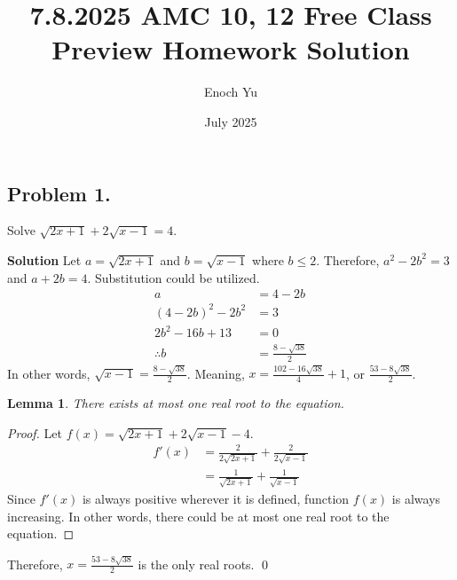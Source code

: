 \documentclass{article}
\title{7.8.2025 AMC 10, 12 Free Class Preview Homework Solution}
\author{Enoch Yu}
\date{July 2025}
\newtheorem*{lemma*}{Lemma}
\newenvironment{solution}{\begin{trivlist}\item[]{\bf Solution}}{\qed \end{trivlist}}
\begin{document}
\maketitle

\subsection*{Problem 1.}
Solve $\sqrt{2x + 1} + 2\sqrt{x - 1} = 4$.

\begin{solution}
Let $a = \sqrt{2x + 1}$ and $b = \sqrt{x - 1}$ where
$b \le 2$. Therefore, $a^2 - 2b^2 = 3$ and $a + 2b = 4$.
Substitution could be utilized.
\begin{align*}
    a &= 4 - 2b \\
    (4 - 2b)^2 - 2b^2 &= 3 \\
    2b^2 - 16b + 13 &= 0 \\
    \therefore b &= \frac{8 - \sqrt{38}}{2}
\end{align*}
In other words, $\sqrt{x - 1} = \frac{8 - \sqrt{38}}{2}$.
Meaning, $x = \frac{102 - 16\sqrt{38}}{4} + 1$,
or $\frac{53 - 8\sqrt{38}}{2}$.
\begin{lemma*}
There exists at most one real root to the equation.
\end{lemma*}
\begin{proof}
Let $f(x) = \sqrt{2x + 1} + 2\sqrt{x - 1} - 4$.
\begin{align*}
    f'(x)
    &= \frac{2}{2\sqrt{2x + 1}} + \frac{2}{2\sqrt{x - 1}} \\
    &= \frac{1}{\sqrt{2x + 1}} + \frac{1}{\sqrt{x - 1}}
\end{align*}
Since $f'(x)$ is always positive wherever it is defined,
function $f(x)$ is always increasing. In other words,
there could be at most one real root to the equation.
\end{proof}
\noindent
Therefore, $x = \frac{53 - 8\sqrt{38}}{2}$ is the only real roots.
\end{solution}
\end{document}
